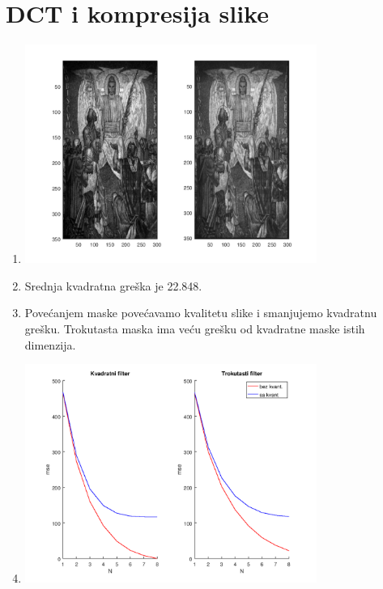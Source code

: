 \documentclass[12pt, a4]{report}
\begin{document}
        \section{DCT i kompresija slike}
            \begin{enumerate}
                \item
                    \begin{minipage}{\linewidth}
                        \centering
                        \includegraphics[width=0.75\textwidth]{dct_compression}
                    \end{minipage}
                \item
                    Srednja kvadratna greška je 22.848.
                \item
                    Povećanjem maske povećavamo kvalitetu slike i smanjujemo kvadratnu grešku. Trokutasta maska ima veću grešku od kvadratne maske istih dimenzija.
                \item
                    \begin{minipage}{\linewidth}
                        \centering
                        \includegraphics[width=0.75\textwidth]{mse_plots}
                    \end{minipage}
            \end{enumerate}
        
\end{document}
